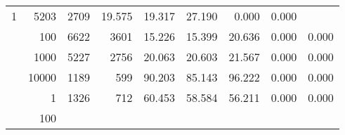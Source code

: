 \begin{table}
\begin{tabular}{rrrrrrrrr}
					
					 
					\multirow{ 1 }{*}{ 1 } &
					
						
							    
							     5203  & 2709  
	                           & 19.575 & 19.317 & 27.190
	                           & 0.000 & 0.000  \\
	                
	            
					 &  
					 
					\multirow{ 1 }{*}{ 100 } &
					
						
							    
							     6622  & 3601  
	                           & 15.226 & 15.399 & 20.636
	                           & 0.000 & 0.000  \\
	                
	            
					 &  
					 
					\multirow{ 1 }{*}{ 1000 } &
					
						
							    
							     5227  & 2756  
	                           & 20.063 & 20.603 & 21.567
	                           & 0.000 & 0.000  \\
	                
	            
					 &  
					 
					\multirow{ 1 }{*}{ 10000 } &
					
						
							    
							     1189  & 599  
	                           & 90.203 & 85.143 & 96.222
	                           & 0.000 & 0.000  \\
	                
	            
	        
				\noalign{\smallskip}\hline
				\multirow{ 4 }{*}{ 2000000 } &
				
					
					 
					\multirow{ 1 }{*}{ 1 } &
					
						
							    
							     1326  & 712  
	                           & 60.453 & 58.584 & 56.211
	                           & 0.000 & 0.000  \\
	                
	            
					 &  
					 
					\multirow{ 1 }{*}{ 100 } &
					
						
							    

\end{tabular}
\end{table}
